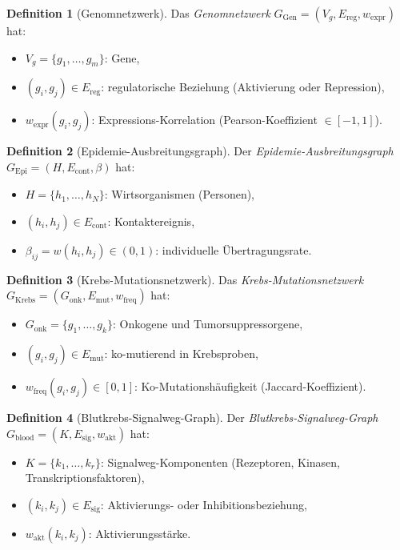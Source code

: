 ﻿\documentclass[a4paper,12pt]{article}
\theoremstyle{plain}
\theoremstyle{definition}
\newtheorem{definition}{Definition}
\theoremstyle{remark}
\newcommand{\Ggen}{G_{\mathrm{Gen}}}
\newcommand{\Gepi}{G_{\mathrm{Epi}}}
\newcommand{\Gkrebs}{G_{\mathrm{Krebs}}}
\newcommand{\Gblood}{G_{\mathrm{blood}}}
\begin{document}
\begin{definition}[Genomnetzwerk]
\label{def:gen}
Das \emph{Genomnetzwerk} $\Ggen = (V_g, E_{\mathrm{reg}}, w_{\mathrm{expr}})$
hat:
\begin{itemize}
    \item $V_g = \{g_1, \ldots, g_m\}$: Gene,
    \item $(g_i, g_j) \in E_{\mathrm{reg}}$:
          regulatorische Beziehung (Aktivierung oder Repression),
    \item $w_{\mathrm{expr}}(g_i, g_j)$: Expressions-Korrelation
          (Pearson-Koeffizient $\in [-1,1]$).
\end{itemize}
\end{definition}

\begin{definition}[Epidemie-Ausbreitungsgraph]
\label{def:epi}
Der \emph{Epidemie-Ausbreitungsgraph}
$\Gepi = (H, E_{\mathrm{cont}}, \beta)$ hat:
\begin{itemize}
    \item $H = \{h_1, \ldots, h_N\}$: Wirtsorganismen (Personen),
    \item $(h_i, h_j) \in E_{\mathrm{cont}}$: Kontaktereignis,
    \item $\beta_{ij} = w(h_i, h_j) \in (0,1)$:
          individuelle \"Ubertragungsrate.
\end{itemize}
\end{definition}

\begin{definition}[Krebs-Mutationsnetzwerk]
\label{def:krebs}
Das \emph{Krebs-Mutationsnetzwerk}
$\Gkrebs = (G_{\mathrm{onk}}, E_{\mathrm{mut}}, w_{\mathrm{freq}})$ hat:
\begin{itemize}
    \item $G_{\mathrm{onk}} = \{g_1, \ldots, g_k\}$:
          Onkogene und Tumorsuppressorgene,
    \item $(g_i, g_j) \in E_{\mathrm{mut}}$:
          ko-mutierend in Krebsproben,
    \item $w_{\mathrm{freq}}(g_i, g_j) \in [0,1]$:
          Ko-Mutationsh\"aufigkeit (Jaccard-Koeffizient).
\end{itemize}
\end{definition}

\begin{definition}[Blutkrebs-Signalweg-Graph]
\label{def:blood}
Der \emph{Blutkrebs-Signalweg-Graph}
$\Gblood = (K, E_{\mathrm{sig}}, w_{\mathrm{akt}})$ hat:
\begin{itemize}
    \item $K = \{k_1, \ldots, k_r\}$: Signalweg-Komponenten
          (Rezeptoren, Kinasen, Transkriptionsfaktoren),
    \item $(k_i, k_j) \in E_{\mathrm{sig}}$:
          Aktivierungs- oder Inhibitionsbeziehung,
    \item $w_{\mathrm{akt}}(k_i, k_j)$: Aktivierungsstärke.
\end{itemize}
\end{definition}
\end{document}
